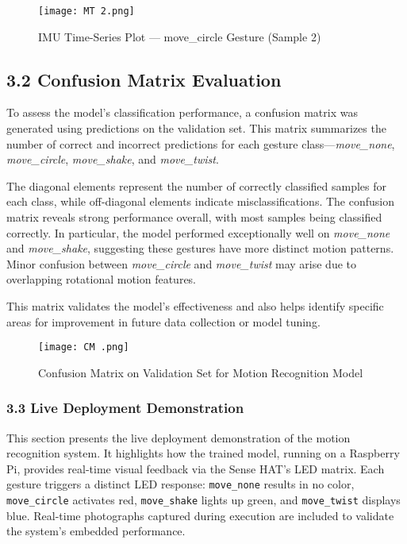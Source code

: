 \documentclass[a4paper,12pt]{article}
\begin{document}
\begin{figure}[H]
    \centering
    \texttt{[image: MT 2.png]}
    \caption{IMU Time-Series Plot — move\_circle Gesture (Sample 2)}
\end{figure}

\subsection*{3.2 Confusion Matrix Evaluation}

To assess the model’s classification performance, a confusion matrix was generated using predictions on the validation set. This matrix summarizes the number of correct and incorrect predictions for each gesture class—\textit{move\_none}, \textit{move\_circle}, \textit{move\_shake}, and \textit{move\_twist}.

The diagonal elements represent the number of correctly classified samples for each class, while off-diagonal elements indicate misclassifications. The confusion matrix reveals strong performance overall, with most samples being classified correctly. In particular, the model performed exceptionally well on \textit{move\_none} and \textit{move\_shake}, suggesting these gestures have more distinct motion patterns. Minor confusion between \textit{move\_circle} and \textit{move\_twist} may arise due to overlapping rotational motion features.

This matrix validates the model’s effectiveness and also helps identify specific areas for improvement in future data collection or model tuning.

\begin{figure}[H]
    \centering
    \texttt{[image: CM .png]}
    \caption{Confusion Matrix on Validation Set for Motion Recognition Model}
\end{figure}

\subsubsection*{3.3 Live Deployment Demonstration}

This section presents the live deployment demonstration of the motion recognition system. It highlights how the trained model, running on a Raspberry Pi, provides real-time visual feedback via the Sense HAT’s LED matrix. Each gesture triggers a distinct LED response: \texttt{move\_none} results in no color, \texttt{move\_circle} activates red, \texttt{move\_shake} lights up green, and \texttt{move\_twist} displays blue. Real-time photographs captured during execution are included to validate the system's embedded performance.
\end{document}
